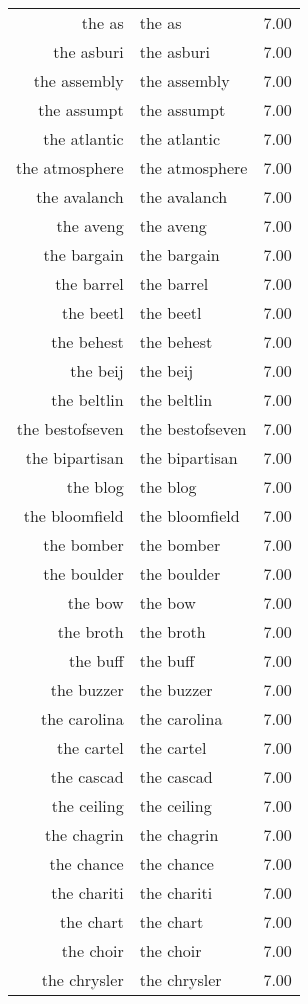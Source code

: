 \begin{table}[ht]
\begin{tabular}{rlr}
  the as & the as & 7.00 \\ 
  the asburi & the asburi & 7.00 \\ 
  the assembly & the assembly & 7.00 \\ 
  the assumpt & the assumpt & 7.00 \\ 
  the atlantic & the atlantic & 7.00 \\ 
  the atmosphere & the atmosphere & 7.00 \\ 
  the avalanch & the avalanch & 7.00 \\ 
  the aveng & the aveng & 7.00 \\ 
  the bargain & the bargain & 7.00 \\ 
  the barrel & the barrel & 7.00 \\ 
  the beetl & the beetl & 7.00 \\ 
  the behest & the behest & 7.00 \\ 
  the beij & the beij & 7.00 \\ 
  the beltlin & the beltlin & 7.00 \\ 
  the bestofseven & the bestofseven & 7.00 \\ 
  the bipartisan & the bipartisan & 7.00 \\ 
  the blog & the blog & 7.00 \\ 
  the bloomfield & the bloomfield & 7.00 \\ 
  the bomber & the bomber & 7.00 \\ 
  the boulder & the boulder & 7.00 \\ 
  the bow & the bow & 7.00 \\ 
  the broth & the broth & 7.00 \\ 
  the buff & the buff & 7.00 \\ 
  the buzzer & the buzzer & 7.00 \\ 
  the carolina & the carolina & 7.00 \\ 
  the cartel & the cartel & 7.00 \\ 
  the cascad & the cascad & 7.00 \\ 
  the ceiling & the ceiling & 7.00 \\ 
  the chagrin & the chagrin & 7.00 \\ 
  the chance & the chance & 7.00 \\ 
  the chariti & the chariti & 7.00 \\ 
  the chart & the chart & 7.00 \\ 
  the choir & the choir & 7.00 \\ 
  the chrysler & the chrysler & 7.00 \\ 

\end{tabular}
\end{table}
